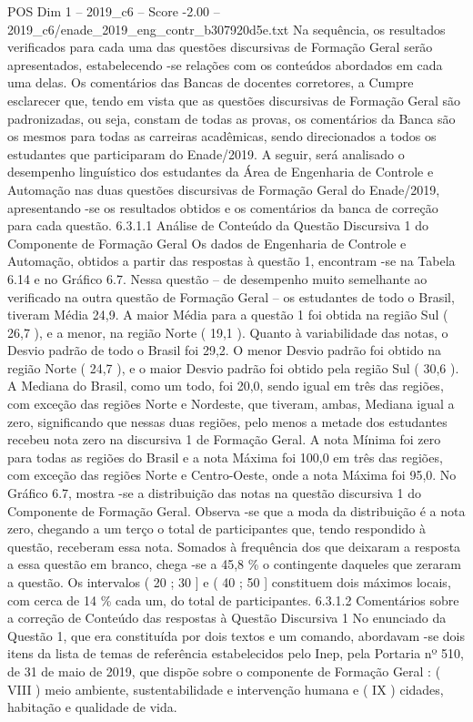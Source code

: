 \begin{textsample}{POS Dim 1 – 2019\_c6 – Score -2.00 – 2019\_c6/enade\_2019\_eng\_contr\_b307920d5e.txt}
Na sequência, os resultados verificados para cada uma das questões discursivas de Formação Geral serão apresentados, estabelecendo -se relações com os conteúdos abordados em cada uma delas.
Os comentários das Bancas de docentes corretores, a Cumpre esclarecer que, tendo em vista que as questões discursivas de Formação Geral são padronizadas, ou seja, constam de todas as provas, os comentários da Banca são os mesmos para todas as carreiras acadêmicas, sendo direcionados a todos os estudantes que participaram do Enade/2019.
A seguir, será analisado o desempenho linguístico dos estudantes da Área de Engenharia de Controle e Automação nas duas questões discursivas de Formação Geral do Enade/2019, apresentando -se os resultados obtidos e os comentários da banca de correção para cada questão. 6.3.1.1 Análise de Conteúdo da Questão Discursiva 1 do Componente de Formação Geral Os dados de Engenharia de Controle e Automação, obtidos a partir das respostas à questão 1, encontram -se na Tabela 6.14 e no Gráfico 6.7.
Nessa questão – de desempenho muito semelhante ao verificado na outra questão de Formação Geral – os estudantes de todo o Brasil, tiveram Média 24,9.
A maior Média para a questão 1 foi obtida na região Sul ( 26,7 ), e a menor, na região Norte ( 19,1 ).
Quanto à variabilidade das notas, o Desvio padrão de todo o Brasil foi 29,2.
O menor Desvio padrão foi obtido na região Norte ( 24,7 ), e o maior Desvio padrão foi obtido pela região Sul ( 30,6 ).
A Mediana do Brasil, como um todo, foi 20,0, sendo igual em três das regiões, com exceção das regiões Norte e Nordeste, que tiveram, ambas, Mediana igual a zero, significando que nessas duas regiões, pelo menos a metade dos estudantes recebeu nota zero na discursiva 1 de Formação Geral.
A nota Mínima foi zero para todas as regiões do Brasil e a nota Máxima foi 100,0 em três das regiões, com exceção das regiões Norte e Centro-Oeste, onde a nota Máxima foi 95,0.
No Gráfico 6.7, mostra -se a distribuição das notas na questão discursiva 1 do Componente de Formação Geral.
Observa -se que a moda da distribuição é a nota zero, chegando a um terço o total de participantes que, tendo respondido à questão, receberam essa nota.
Somados à frequência dos que deixaram a resposta a essa questão em branco, chega -se a 45,8 \% o contingente daqueles que zeraram a questão.
Os intervalos ( 20 ; 30 ] e ( 40 ; 50 ] constituem dois máximos locais, com cerca de 14 \% cada um, do total de participantes. 6.3.1.2 Comentários sobre a correção de Conteúdo das respostas à Questão Discursiva 1 No enunciado da Questão 1, que era constituída por dois textos e um comando, abordavam -se dois itens da lista de temas de referência estabelecidos pelo Inep, pela Portaria nº 510, de 31 de maio de 2019, que dispõe sobre o componente de Formação Geral : ( VIII ) meio ambiente, sustentabilidade e intervenção humana e ( IX ) cidades, habitação e qualidade de vida.

\end{textsample}

